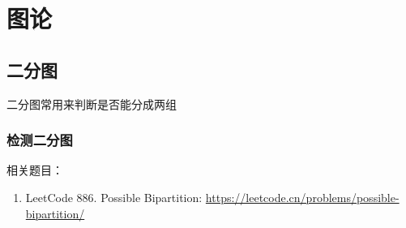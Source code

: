 \chapter{图论}
\begin{center}
\end{center}

\section{二分图}
二分图常用来判断是否能分成两组

\subsection{检测二分图}


\ifshowLink
相关题目：
    \begin{enumerate}
        \item LeetCode 886. Possible Bipartition: \href{https://leetcode.cn/problems/possible-bipartition/}{https://leetcode.cn/problems/possible-bipartition/}
    \end{enumerate}
\fi